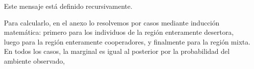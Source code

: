\documentclass[a4paper,10pt]{article}
\newif\ifen
\newif\ifes
\newcommand{\en}[1]{\ifen#1\fi}
\newcommand{\es}[1]{\ifes#1\fi}
\newcommand{\Ee}{\en{s}\es{e}}
\newcommand{\Aa}{\en{e}\es{a}}
\begin{document}
%
Este mensaje está definido recursivamente.
%


% 
% 
%
Para calcularlo, en el anexo lo resolvemos por casos mediante inducción matemática: primero para los individuos de la región enteramente desertora, luego para la región enteramente cooperadores, y finalmente para la región mixta.
%
En todos los casos, la marginal es igual al posterior por la probabilidad del ambiente observado,
\end{document}
